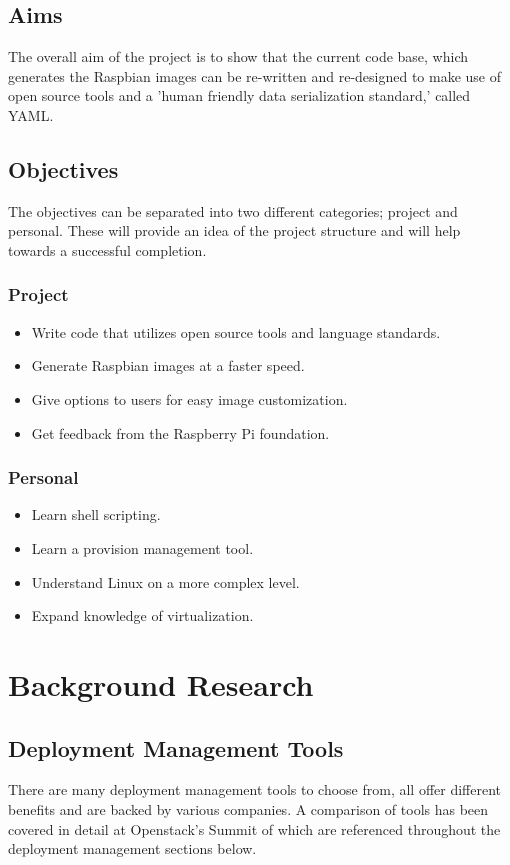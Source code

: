 \documentclass[12pt,a4paper]{report}
\begin{document}
\section{Aims}
The overall aim of the project is to show that the current code base, which generates the Raspbian images can be re-written and re-designed to make use of open source tools and a 'human friendly data serialization standard,' \citep{yaml} called YAML. 
\section{Objectives}
The objectives can be separated into two different categories; project and personal. These will provide an idea of the project structure and will help towards a successful completion. 
\subsection{Project}
\begin{itemize}
\item{Write code that utilizes open source tools and language standards.}
\item{Generate Raspbian images at a faster speed.}
\item{Give options to users for easy image customization.}
\item{Get feedback from the Raspberry Pi foundation.}
\end{itemize}  
\subsection{Personal}
\begin{itemize}
\item{Learn shell scripting.}
\item{Learn a provision management tool.}
\item{Understand Linux on a more complex level.}
\item{Expand knowledge of virtualization.}
\end{itemize}  

\chapter{Background Research}
\section{Deployment Management Tools}
There are many deployment management tools to choose from, all offer different benefits and are backed by various companies. A comparison of tools has been covered in detail at Openstack's Summit \citep{openstack} of which are referenced throughout the deployment management sections below.    	
\end{document}
